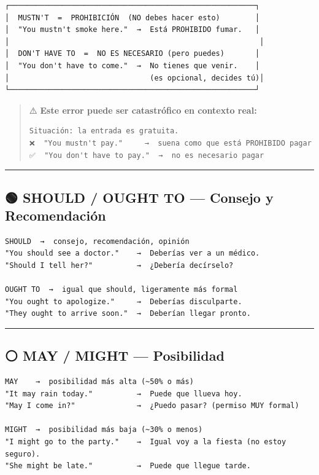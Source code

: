 \documentclass[
  spanish,
  letterpaper,
]{scrbook}
\begin{document}
\begin{verbatim}
┌────────────────────────────────────────────────────────┐
│  MUSTN'T  =  PROHIBICIÓN  (NO debes hacer esto)        │
│  "You mustn't smoke here."  →  Está PROHIBIDO fumar.   │
│                                                         │
│  DON'T HAVE TO  =  NO ES NECESARIO (pero puedes)       │
│  "You don't have to come."  →  No tienes que venir.    │
│                                (es opcional, decides tú)│
└────────────────────────────────────────────────────────┘
\end{verbatim}

\begin{quote}
⚠️ \textbf{Este error puede ser catastrófico en contexto real:}

\begin{verbatim}
Situación: la entrada es gratuita.
❌  "You mustn't pay."     →  suena como que está PROHIBIDO pagar
✅  "You don't have to pay."  →  no es necesario pagar
\end{verbatim}
\end{quote}

\begin{center}\rule{0.5\linewidth}{0.5pt}\end{center}

\subsection{🟢 SHOULD / OUGHT TO --- Consejo y
Recomendación}\label{should-ought-to-consejo-y-recomendaciuxf3n}

\begin{verbatim}
SHOULD  →  consejo, recomendación, opinión
"You should see a doctor."    →  Deberías ver a un médico.
"Should I tell her?"          →  ¿Debería decírselo?

OUGHT TO  →  igual que should, ligeramente más formal
"You ought to apologize."     →  Deberías disculparte.
"They ought to arrive soon."  →  Deberían llegar pronto.
\end{verbatim}

\begin{center}\rule{0.5\linewidth}{0.5pt}\end{center}

\subsection{⚪ MAY / MIGHT --- Posibilidad}\label{may-might-posibilidad}

\begin{verbatim}
MAY    →  posibilidad más alta (~50% o más)
"It may rain today."          →  Puede que llueva hoy.
"May I come in?"              →  ¿Puedo pasar? (permiso MUY formal)

MIGHT  →  posibilidad más baja (~30% o menos)
"I might go to the party."    →  Igual voy a la fiesta (no estoy seguro).
"She might be late."          →  Puede que llegue tarde.
\end{verbatim}
\end{document}
